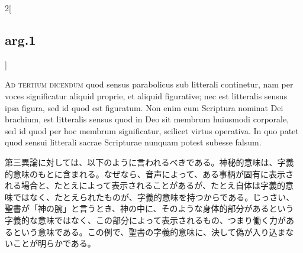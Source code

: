 \documentclass[
paper=a4paper,
fontsize=10pt,
jafontsize=9pt,
titlepage
]{jlreq}
\begin{document}
\begin{paracol}{2}[\subsection{arg.1}]
\switchcolumn*[\subsection{ad.3}]

{\scshape Ad tertium dicendum} quod sensus parabolicus sub litterali
continetur, nam per voces significatur aliquid proprie, et aliquid
figurative; nec est litteralis sensus ipsa figura, sed id quod est
figuratum. Non enim cum Scriptura nominat Dei brachium, est litteralis
sensus quod in Deo sit membrum huiusmodi corporale, sed id quod per
hoc membrum significatur, scilicet virtus operativa. In quo patet quod
sensui litterali sacrae Scripturae nunquam potest subesse falsum.

\switchcolumn

第三異論に対しては、以下のように言われるべきである。神秘的意味は、字義
的意味のもとに含まれる。なぜなら、音声によって、ある事柄が固有に表示さ
れる場合と、たとえによって表示されることがあるが、たとえ自体は字義的意
味ではなく、たとえられたものが、字義的意味を持つからである。じっさい、
聖書が「神の腕」と言うとき、神の中に、そのような身体的部分があるという
字義的な意味ではなく、この部分によって表示されるもの、つまり働く力があ
るという意味である。この例で、聖書の字義的意味に、決して偽が入り込まな
いことが明らかである。

\end{paracol}
\end{document}
